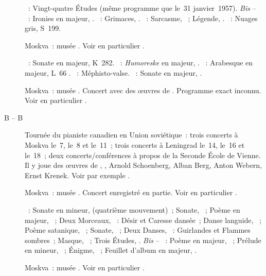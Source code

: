 \begin{description}
 \textsc{\Scriabine{}}~: Vingt-quatre Études (même programme que le~31
 janvier~1957).
 \emph{Bis} -- \textsc{\Scriabine{}}~: Ironies en \kC majeur, 
 .
 \textsc{\Liadov{}}~: Grimaces,  .
 \textsc{\Prokofiev{}}~: Sarcasme,  ~; Légende, 
 .
 \textsc{\Liszt{}}~: Nuages gris, S~199.
 \item[\DateWithWeekDay{1957-03-30}]
 Moskva~: musée \Scriabine{}.
 Voir en particulier \citet[p.~450]{Milshteyn82a}.

 \textsc{\Mozart{}}~: Sonate  en \kE \Flat majeur, K~282.
 \textsc{\Schumann{}}~: \emph{Humoreske} en \kB \Flat majeur, .
 \textsc{\Debussy{}}~: Arabesque  en \kE majeur, L~66 .
 \textsc{\Liszt{}}~: Méphisto-valse.
 \textsc{\Scriabine{}}~: Sonate en \kF \Sharp majeur, .
 \item[\DateWithWeekDay{1957-05-06}]
 Moskva~: musée \Scriabine{}.
 Concert avec des œuvres de \Scriabine{}.
 Programme exact inconnu.
 Voir en particulier \citet[p.~450]{Milshteyn82a}.
 \item[B\DateWithWeekDay{1957-05-07} -- B\DateWithWeekDay{1957-05-19}]
 Tournée du pianiste canadien \GGould{} en Union soviétique~: trois concerts
 à Moskva le~7, le~8 et le~11~; trois concerts à Leningrad le~14, le~16 et
 le~18~; deux concerts/conférences à propos de la Seconde École de Vienne.
 Il y joue des œuvres de \JBach{}, \LBeethoven{}, Arnold Schoenberg, Alban
 Berg, Anton Webern, Ernst Krenek.
 Voir par exemple \citet[p.~396]{Shiryaeva}.
 \item[\DateWithWeekDay{1957-05-16}]
 Moskva~: musée \Scriabine{}.
 Concert enregistré en partie.
 Voir en particulier \citet[p.~450]{Milshteyn82a}.

 \textsc{\Scriabine{}}~: Sonate en \kF mineur,  (quatrième
 mouvement)~; Sonate, ~; Poème en \kC majeur, 
 ~; Deux Morceaux, ~:  Désir et 
 Caresse dansée~; Danse languide,  ~; Poème satanique,
 ~; Sonate, ~; Deux Danses, ~: 
 Guirlandes et  Flammes sombres~; Masque,  ~;
 Trois Études, .
 \emph{Bis} -- \textsc{\Scriabine{}}~: Poème en \kF \Sharp majeur, 
 ~; Prélude en \kE \Flat mineur,  ~; Énigme,
  ~; Feuillet d'album en \kE \Flat majeur, 
 .
 \item[\DateWithWeekDay{1957-06-12}]
 Moskva~: musée \Scriabine{}.
 Voir en particulier \citet[p.~450]{Milshteyn82a}.


\end{description}
